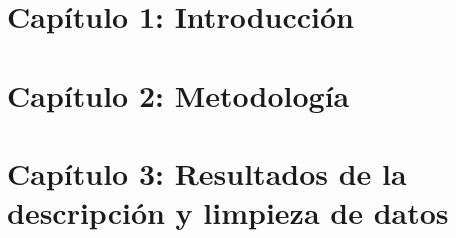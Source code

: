 \documentclass[11pt,a4paper,twoside]{tesis}
\begin{document}
\def\titulo{Magister en explotación de datos y descubrimiento del conocimiento}

\def\autor{Ing. María del Pilar Ávila Williams}
\def\tituloTesis{Aplicación de técnicas de graph mining para buscar patrones
 en la lista de problemas de la historia clínica del Hospital Italiano de Buenos Aires.}
\def\runtitulo{Aplicación de técnicas de graph mining para buscar patrones en la lista de problemas de la historia clínica del Hospital Italiano de Buenos Aires}
\def\runtitle{Application of graph mining techniques to look for patterns in the list of problems in the medical history of the Hospital Italiano de Buenos Aires}
\def\director{Dr. Marcelo Soria}
\def\lugar{Buenos Aires, 2018}


\frontmatter
\pagestyle{empty}


\cleardoublepage


\cleardoublepage

\cleardoublepage

\cleardoublepage
\setcounter{tocdepth}{3}
\setcounter{secnumdepth}{3}
\tableofcontents
\renewcommand{\listfigurename}{Listado de figuras}
\listoffigures
 
\renewcommand{\listtablename}{Listado de tablas}
\listoftables


\printglossary[type=\acronymtype,title={Abreviaturas}]
\printglossary

\cleardoublepage
\mainmatter
\pagestyle{headings}


\chapter{Capítulo 1: Introducción}


\chapter{Capítulo 2: Metodología}


\chapter{Capítulo 3: Resultados de la descripción y limpieza de datos}

 
\end{document}
